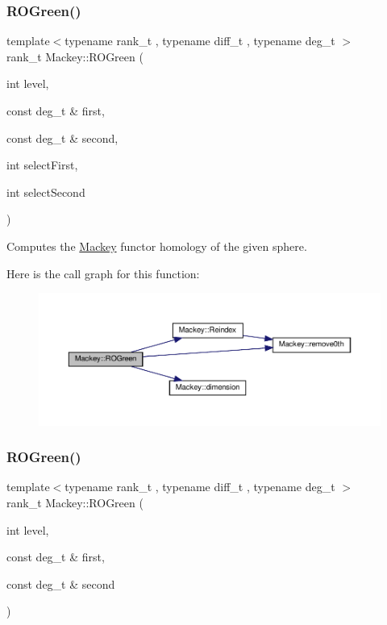 \subsubsection{\texorpdfstring{R\+O\+Green()}{ROGreen()}\hspace{0.1cm}{\footnotesize\ttfamily [1/2]}}
{\footnotesize\ttfamily template$<$typename rank\+\_\+t , typename diff\+\_\+t , typename deg\+\_\+t $>$ \\
rank\+\_\+t Mackey\+::\+R\+O\+Green (\begin{DoxyParamCaption}\item[{int}]{level,  }\item[{const deg\+\_\+t \&}]{first,  }\item[{const deg\+\_\+t \&}]{second,  }\item[{int}]{select\+First,  }\item[{int}]{select\+Second }\end{DoxyParamCaption})}



Computes the \hyperlink{namespaceMackey}{Mackey} functor homology of the given sphere. 

Here is the call graph for this function\+:\nopagebreak
\begin{figure}[H]
\begin{center}
\leavevmode
\includegraphics[width=350pt]{namespaceMackey_a2bd86833844ca62d76c47a54aeb0bb77_cgraph}
\end{center}
\end{figure}
\mbox{\label{namespaceMackey_a07d3b1e748c6cf2fd8a6e21b948a0afe}} 
\subsubsection{\texorpdfstring{R\+O\+Green()}{ROGreen()}\hspace{0.1cm}{\footnotesize\ttfamily [2/2]}}
{\footnotesize\ttfamily template$<$typename rank\+\_\+t , typename diff\+\_\+t , typename deg\+\_\+t $>$ \\
rank\+\_\+t Mackey\+::\+R\+O\+Green (\begin{DoxyParamCaption}\item[{int}]{level,  }\item[{const deg\+\_\+t \&}]{first,  }\item[{const deg\+\_\+t \&}]{second }\end{DoxyParamCaption})}




